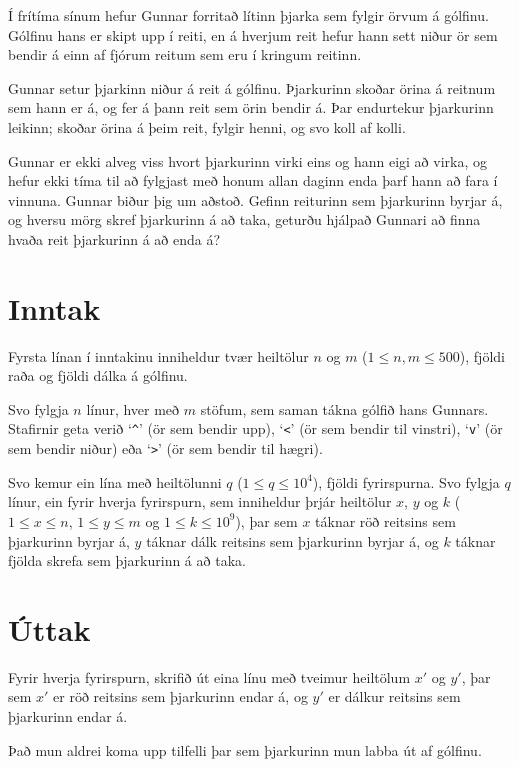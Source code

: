 
Í frítíma sínum hefur Gunnar forritað lítinn þjarka sem fylgir örvum á gólfinu.
Gólfinu hans er skipt upp í reiti, en á hverjum reit hefur hann sett niður ör
sem bendir á einn af fjórum reitum sem eru í kringum reitinn.

Gunnar setur þjarkinn niður á reit á gólfinu. Þjarkurinn skoðar örina á reitnum
sem hann er á, og fer á þann reit sem örin bendir á. Þar endurtekur þjarkurinn
leikinn; skoðar örina á þeim reit, fylgir henni, og svo koll af kolli.

Gunnar er ekki alveg viss hvort þjarkurinn virki eins og hann eigi að virka, og
hefur ekki tíma til að fylgjast með honum allan daginn enda þarf hann að fara í
vinnuna. Gunnar biður þig um aðstoð. Gefinn reiturinn sem þjarkurinn byrjar á,
og hversu mörg skref þjarkurinn á að taka, geturðu hjálpað Gunnari að finna
hvaða reit þjarkurinn á að enda á?

\section*{Inntak}
Fyrsta línan í inntakinu inniheldur tvær heiltölur $n$ og $m$ ($1 \leq n,m \leq
500$), fjöldi raða og fjöldi dálka á gólfinu.

Svo fylgja $n$ línur, hver með $m$ stöfum, sem saman tákna gólfið hans Gunnars.
Stafirnir geta verið
`\texttt{\^{}}' (ör sem bendir upp),
`\texttt{<}' (ör sem bendir til vinstri),
`\texttt{v}' (ör sem bendir niður) eða
`\texttt{>}' (ör sem bendir til hægri).

Svo kemur ein lína með heiltölunni $q$ ($1 \leq q \leq 10^4$), fjöldi
fyrirspurna. Svo fylgja $q$ línur, ein fyrir hverja fyrirspurn, sem inniheldur
þrjár heiltölur $x$, $y$ og $k$ ($1\leq x \leq n$, $1 \leq y \leq m$ og $1 \leq
k \leq 10^9$), þar sem $x$ táknar röð reitsins sem þjarkurinn byrjar á, $y$
táknar dálk reitsins sem þjarkurinn byrjar á, og $k$ táknar fjölda skrefa sem
þjarkurinn á að taka.

\section*{Úttak}
Fyrir hverja fyrirspurn, skrifið út eina línu með tveimur heiltölum $x'$ og
$y'$, þar sem $x'$ er röð reitsins sem þjarkurinn endar á, og $y'$ er dálkur
reitsins sem þjarkurinn endar á.

Það mun aldrei koma upp tilfelli þar sem þjarkurinn mun labba út af gólfinu.


